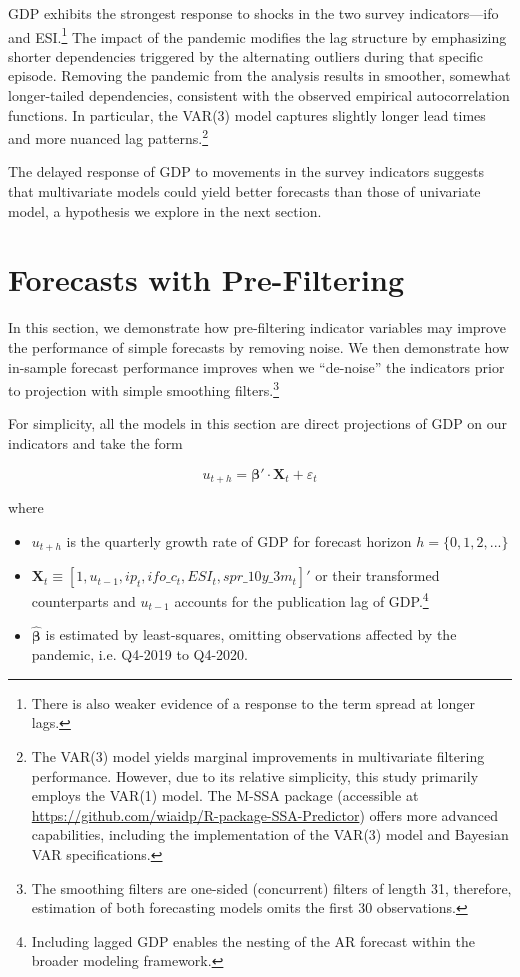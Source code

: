 \documentclass[11pt,a4paper]{article}
\begin{document}
GDP exhibits the strongest response to shocks in the two survey indicators—ifo and ESI.\footnote{There is also weaker evidence of a response to the term spread at longer lags.} The impact of the pandemic modifies the lag structure by emphasizing shorter dependencies triggered by the alternating outliers during that specific episode. Removing the pandemic from the analysis results in smoother, somewhat longer-tailed dependencies, consistent with the observed empirical autocorrelation functions. In particular, the VAR(3) model captures slightly longer lead times and more nuanced lag patterns.\footnote{The VAR(3) model yields marginal improvements in multivariate filtering performance. However, due to its relative simplicity, this study primarily employs the VAR(1) model. The M-SSA package (accessible at \url{https://github.com/wiaidp/R-package-SSA-Predictor}) offers more advanced capabilities, including the implementation of the VAR(3) model and Bayesian VAR specifications.} 

The delayed response of GDP to movements in the survey indicators suggests that multivariate models could yield better forecasts than those of univariate model, a hypothesis we explore in the next section.


\section{Forecasts with Pre-Filtering}\label{sec:direct_forecast}

In this section, we demonstrate how pre-filtering indicator variables may improve the performance of simple forecasts by removing noise. We then demonstrate how in-sample forecast performance improves when we ``de-noise'' the indicators prior to projection with simple smoothing filters.\footnote{The smoothing filters are one-sided (concurrent) filters of length 31, therefore, estimation of both forecasting models omits the first 30 observations.}

For simplicity, all the models in this section are direct projections of GDP on our indicators and take the form

\begin{equation}
    u_{t+h} = \boldsymbol{\beta'} \cdot \mathbf{X}_t + \varepsilon_t
    \label{eq:direct_forecast}
\end{equation}

where
\begin{itemize}
    \item $u_{t+h}$ is the quarterly growth rate of GDP for forecast horizon $h = \{0, 1, 2, ... \}$
    \item $\mathbf{X}_t \equiv [1,u_{t-1}, ip_t, ifo\_c_t, ESI_t, spr\_10y\_3m_t]'$ or their transformed counterparts and $u_{t-1}$ accounts for the publication lag of GDP.\footnote{Including lagged GDP enables the nesting of the AR forecast within the broader modeling framework.}
    \item $\hat{\boldsymbol{\beta}}$ is estimated by least-squares, omitting observations affected by the pandemic, i.e. Q4-2019 to Q4-2020.
\end{itemize}
\end{document}
